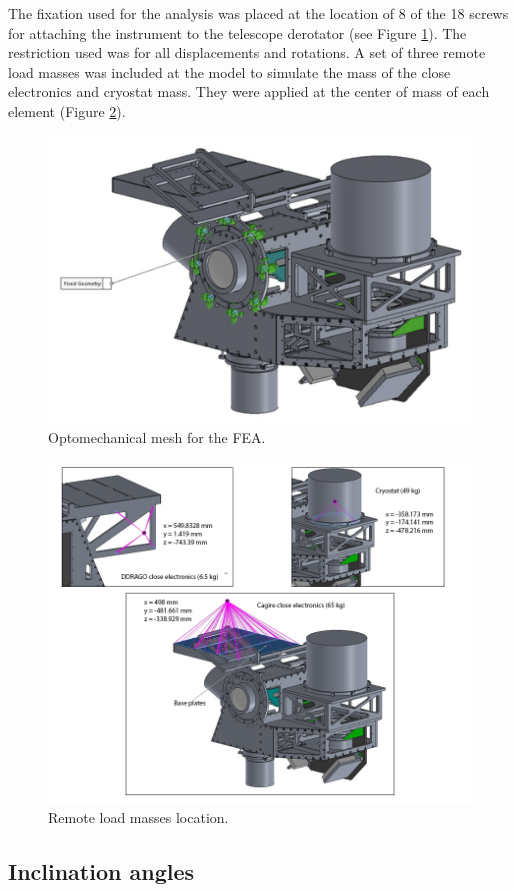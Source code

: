 \documentclass{report}
\begin{document}
The fixation used for the analysis was placed at the location of 8 of the 18 screws for attaching the instrument to the telescope derotator (see Figure \ref{figure:FEAfixa}). The restriction used was for all displacements and rotations. A set of three remote load masses was included at the model to simulate the mass of the close electronics and cryostat mass. They were applied at the center of mass of each element (Figure \ref{figure:FEAcom}).

\begin{figure}
\centering
\includegraphics[width=0.7\linewidth]{figures/FEAfixa.png}
\caption{Optomechanical mesh for the FEA.}
\label{figure:FEAfixa}
\end{figure}

\begin{figure}
\centering
\includegraphics[width=0.9\linewidth]{figures/FEAcom.png}
\caption{Remote load masses location.}
\label{figure:FEAcom}
\end{figure}

\subsection{Inclination angles}
\end{document}
